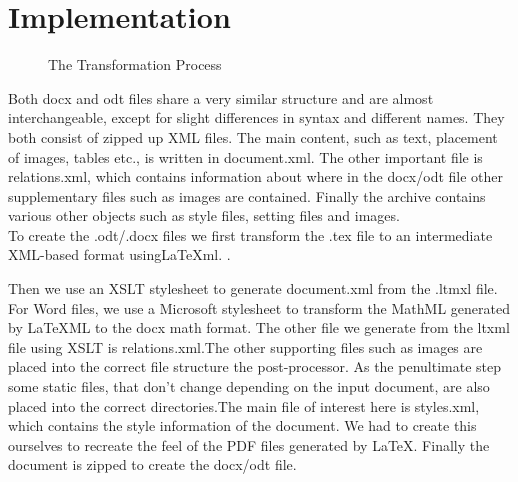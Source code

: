 \documentclass{llncs}
\def\latexml{{\LaTeX}ML\xspace}
\begin{document}
\section{Implementation}\label{sec:impl}

\begin{figure}[ht]\centering
{}
\caption{The Transformation Process}\label{fig:arch}
\end{figure}

Both docx and odt files share a very similar structure and are almost interchangeable,
except for slight differences in syntax and different names. They both consist of zipped up XML files. The main content, such as text, placement of images, tables etc., is written in document.xml. The other important file is relations.xml, which contains information about where in the docx/odt file other supplementary files such as images are contained. Finally the archive contains various other objects such as style files, setting files and images. \\



To create the .odt/.docx files we first transform the .tex file to an intermediate
XML-based format using{\LaTeX}ml. .

Then we use an XSLT stylesheet to generate document.xml from the .ltmxl file. For Word files, we use a Microsoft stylesheet to transform the MathML generated by {\LaTeX}ML to the docx math format. The other file we generate from the ltxml file using XSLT is relations.xml.The other supporting files such as images are placed into the correct file structure the post-processor. As the penultimate step some static files, that don't change depending on the input document, are also placed into the correct directories.The main file of interest here is styles.xml, which contains the style information of the document. We had to create this ourselves to recreate the feel of the PDF files generated by {\LaTeX}. Finally the document is zipped to create the docx/odt file. \\ 
\end{document}

